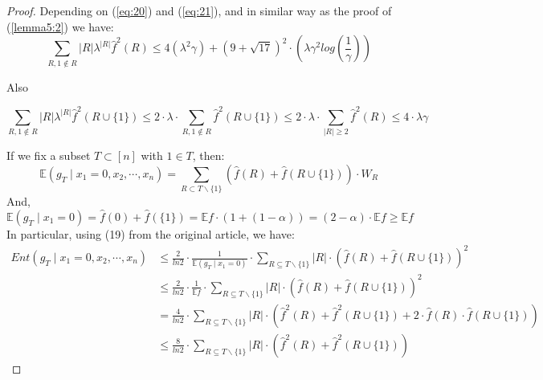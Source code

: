 \documentclass{article}
\begin{document}
			\begin{proof}
				Depending on (\ref{eq:20}) and (\ref{eq:21}), and in similar way as the proof of (\ref{lemma5:2}) we have:
				\begin{equation} \label{boundForR}
					\sum_{R, 1 \notin R} |R| \lambda^{|R|} \hat{f}^2(R) 
					\leq 4 ( \lambda^2 \gamma ) + \left( 9 + \sqrt{17} \right)^2 \cdot \left( \lambda \gamma^2 log \left( \frac{1}{\gamma} \right) \right)
				\end{equation}

				Also
				
				\begin{equation} \label{boundForR+1}
					\sum_{R, 1 \notin R} |R| \lambda^{|R|} \hat{f}^2(R \cup \{1\}) 
					\leq 2 \cdot \lambda \cdot \sum_{R, 1 \notin R} \hat{f}^2(R \cup \{1\})
					\leq 2 \cdot \lambda \cdot \sum_{|R| \geq 2} \hat{f}^2(R)
					\leq 4 \cdot \lambda \gamma
				\end{equation}
				
				If we fix a subset $T \subset [n]$ with $1 \in T$, then:
				\begin{equation} \label{g_T with x1=0}
					\mathbb{E} \left( g_T \mid x_1 = 0,x_2, \cdots, x_n \right) = \sum_{R \subset T \backslash \{1\}} \left( \hat{f}(R) + \hat{f}(R \cup \{1\}) \right) \cdot W_R
				\end{equation}
				And,
				\begin{equation}
					\mathbb{E} \left( g_T \mid x_1=0 \right) = \hat{f}(0) + \hat{f}(\{1\}) = \mathbb{E} f \cdot \left( 1 + (1-\alpha) \right) = (2-\alpha) \cdot \mathbb{E} f \geq \mathbb{E} f 
				\end{equation}
				In particular, using (19) from the original article, we have:				
				\begin{equation} \label{entGtX0} \begin{aligned}
					Ent \left( g_T \mid x_1 = 0,x_2, \cdots, x_n \right) 
					& \leq \frac{2}{ln 2} \cdot \frac{1}{\mathbb{E} \left( g_T \mid x_1=0 \right)} \cdot \sum_{R \subseteq {T\backslash \{1\}}} |R| \cdot \left( \hat{f} (R) + \hat{f} (R \cup \{1\}) \right)^2 \\ 
					& \leq \frac{2}{ln 2} \cdot \frac{1}{\mathbb{E} f} \cdot \sum_{R \subseteq {T\backslash \{1\}}} |R| \cdot \left( \hat{f} (R) + \hat{f} (R \cup \{1\}) \right)^2 \\ 
					& = \frac{4}{ln 2} \cdot \sum_{R \subseteq {T\backslash \{1\}}} |R| \cdot \left( \hat{f}^2 (R) + \hat{f}^2 (R \cup \{1\}) + 2 \cdot \hat{f}(R)  \cdot \hat{f} (R \cup \{1\}) \right) \\ 
					& \leq \frac{8}{ln 2} \cdot \sum_{R \subseteq {T\backslash \{1\}}} |R| \cdot \left( \hat{f}^2 (R) + \hat{f}^2 (R \cup \{1\}) \right)
				\end{aligned}
				\end{equation}
				

\end{proof}
\end{document}
